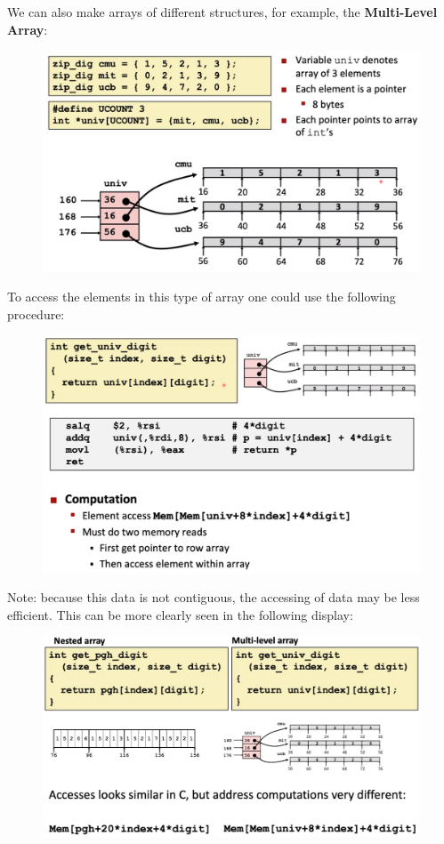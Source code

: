 \documentclass[12pt]{book}
\begin{document}
We can also make arrays of different structures, for example, the \textbf{Multi-Level Array}:
\begin{figure}[h]
        \centering
        \includegraphics[scale = 0.3]{./figures/multilevel1}
\end{figure}
\pagebreak

To access the elements in this type of array one could use the following procedure:
\begin{figure}[h]
        \centering
        \includegraphics[scale = 0.3]{./figures/multilevel2}
\end{figure}

Note: because this data is not contiguous, the accessing of data may be less efficient.
This can be more clearly seen in the following display:
\begin{figure}[h]
        \centering
        \includegraphics[scale = 0.4]{./figures/arrayVmulti}
\end{figure}
\pagebreak
\end{document}
